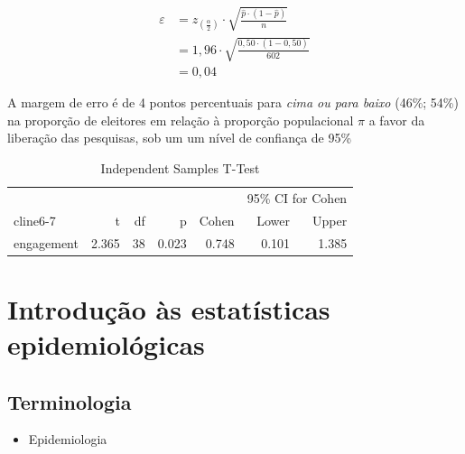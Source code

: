 \documentclass[
]{book}
\providecommand{\tightlist}{%
  \setlength{\itemsep}{0pt}\setlength{\parskip}{0pt}}
\begin{document}
\hfill\break

\begin{align*}
\varepsilon & = {z}_{(\frac{\alpha }{2})}\cdot \sqrt{\frac{\hat{p}\cdot \left(1-\hat{p}\right)}{n}}\\
& = 1,96 \cdot \sqrt{\frac{0,50 \cdot \left(1- 0,50 \right)}{602}}\\
& = 0,04
\end{align*}

\hfill\break

A margem de erro é de 4 pontos percentuais para \emph{cima ou para baixo} (46\%; 54\%) na proporção de eleitores em relação à proporção populacional \(\pi\) a favor da liberação das pesquisas, sob um um nível de confiança de 95\%

\begin{table}[h]
\centering
\caption{Independent Samples T-Test}
\label{tab:independentSamplesT-Test}
{
\begin{tabular}{lrrrrrr}
\toprule
\multicolumn{1}{c}{} & \multicolumn{1}{c}{} & \multicolumn{1}{c}{} & \multicolumn{1}{c}{} & \multicolumn{1}{c}{} & \multicolumn{2}{c}{95\% CI for Cohen} \\
cline{6-7}
& t & df & p & Cohen & Lower & Upper  \\
\cmidrule[0.4pt]{1-7}
engagement & 2.365 & 38 & 0.023 & 0.748 & 0.101 & 1.385  \\
\bottomrule
\end{tabular}
}
\end{table}

\hypertarget{introduuxe7uxe3o-uxe0s-estatuxedsticas-epidemioluxf3gicas}{%
\chapter{Introdução às estatísticas epidemiológicas}\label{introduuxe7uxe3o-uxe0s-estatuxedsticas-epidemioluxf3gicas}}

\hfill\break

\hypertarget{terminologia}{%
\section{Terminologia}\label{terminologia}}

\hfill\break

\begin{itemize}
\tightlist
\item
  Epidemiologia
\end{itemize}
\end{document}
